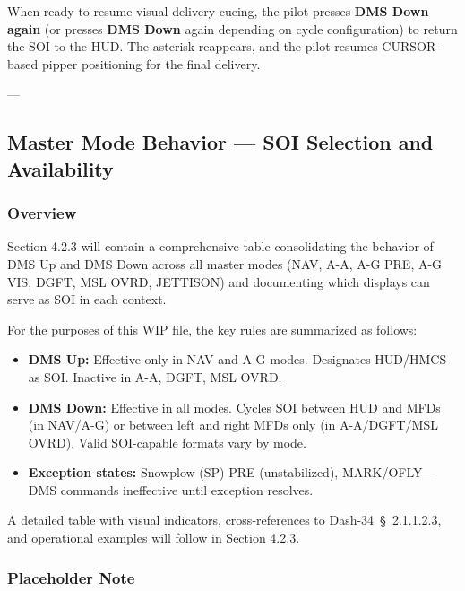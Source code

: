 \documentclass[11pt,a4paper]{article}
\providecommand{\dashref}[1]{Dash-34~\S~#1}
\begin{document}
When ready to resume visual delivery cueing, the pilot presses \textbf{DMS Down again} (or presses \textbf{DMS Down} again depending on cycle configuration) to return the SOI to the HUD. The asterisk reappears, and the pilot resumes CURSOR-based pipper positioning for the final delivery.

---

\subsection{Master Mode Behavior — SOI Selection and Availability}

\label{sec:C4-S2-S3}


\subsubsection{Overview}

Section 4.2.3 will contain a comprehensive table consolidating the behavior of DMS Up and DMS Down across all master modes (NAV, A-A, A-G PRE, A-G VIS, DGFT, MSL OVRD, JETTISON) and documenting which displays can serve as SOI in each context.

For the purposes of this WIP file, the key rules are summarized as follows:

\begin{itemize}

\item \textbf{DMS Up:} Effective only in NAV and A-G modes. Designates HUD/HMCS as SOI. Inactive in A-A, DGFT, MSL OVRD.

\item \textbf{DMS Down:} Effective in all modes. Cycles SOI between HUD and MFDs (in NAV/A-G) or between left and right MFDs only (in A-A/DGFT/MSL OVRD). Valid SOI-capable formats vary by mode.

\item \textbf{Exception states:} Snowplow (SP) PRE (unstabilized), MARK/OFLY—DMS commands ineffective until exception resolves.

\end{itemize}

A detailed table with visual indicators, cross-references to \dashref{2.1.1.2.3}, and operational examples will follow in Section 4.2.3.

\subsubsection{Placeholder Note}
\end{document}

